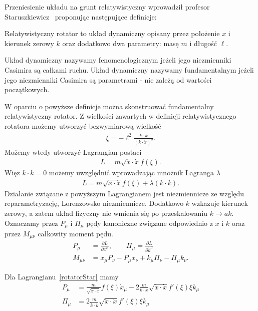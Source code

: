 Przeniesienie układu na grunt relatywistyczny wprowadził 
profesor Staruszkiewicz~\cite{star2008} proponując następujące 
definicje:
\begin{definition}
Relatywistyczny rotator to układ dynamiczny
 opisany przez położenie $x$ i kierunek
zerowy $k$ oraz dodatkowo dwa parametry: masę $m$ i długość $\ell$.
\end{definition}
\begin{definition}
Układ dynamiczny  nazywamy fenomenologicznym jeżeli jego niezmienniki Casimira są 
całkami ruchu. Układ dynamiczny nazywamy fundamentalnym jeżeli jego niezmienniki
Casimira są parametrami - nie zależą od wartości początkowych.
\end{definition}
W oparciu o powyższe definicje można skonstruować fundamentalny
relatywistyczny rotator. Z wielkości zawartych w definicji relatywistycznego 
rotatora możemy utworzyć bezwymiarową wielkość
\begin{align}
\xi = - \ell^2 \frac{\dot{k} \cdot \dot{k}}{ ( k \cdot \dot{x})^2 }.
\end{align}
Możemy wtedy utworzyć Lagrangian postaci
\begin{align}\label{rotatorStar}
L = m \sqrt{ \dot{x} \cdot \dot{x} } f( \xi ) .
\end{align}
Więz $k\cdot k= 0$ możemy uwzględnić wprowadzając mnożnik Lagranga $\lambda$
\begin{align}
L = m \sqrt{ \dot{x} \cdot \dot{x} } f( \xi ) + \lambda( k\cdot k ).
\end{align}
Działanie związane z powyższym Lagrangianem 
jest niezmiennicze ze względu reparametryzację, 
Lorenzowsko niezmiennicze. Dodatkowo $k$ wzkazuje kierunek zerowy, a zatem
 układ fizyczny nie wmienia się
po przeskalowaniu $k \to a k$. 
Oznaczamy przez $P_\mu$ i $\Pi_\mu$ pędy kanoniczne związane 
odpowiednio z $x$ i $k$ oraz przez $M_{\mu\nu}$ całkowity moment pędu.
\begin{align}
P_\mu &= \frac{\partial L}{\partial \dot{x}^\mu}, \qquad
\Pi_\mu = \frac{\partial L}{\partial \dot{k}^\mu} \\
M_{\mu\nu} &= x_\mu P_\nu - P_\mu x_\nu + k_\mu \Pi_\nu - \Pi_\mu k_\nu.
\end{align}

Dla Lagrangianu~\ref{rotatorStar} mamy 
\begin{align}
P_\mu &=  \frac{m}{\sqrt{ \dot{x} \cdot \dot{x} }} f(\xi) \dot{x}_\mu 
- 2 \frac{m}{k \cdot \dot{x}} \sqrt{ \dot{x} \cdot \dot{x} }
f'(\xi) \xi k_\mu  \\
\Pi_\mu &= 2 \frac{m}{\dot{k} \cdot \dot{k}} \sqrt{ \dot{x} \cdot \dot{x} }
f'(\xi) \xi \dot{k}_\mu
\end{align}

